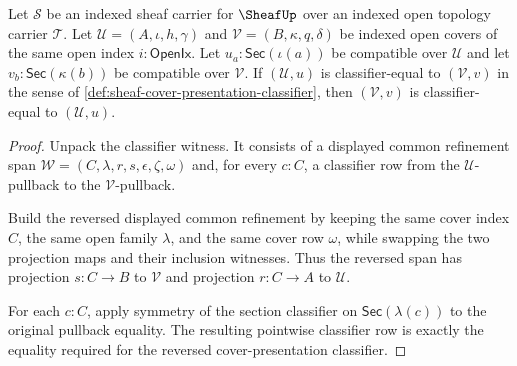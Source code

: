 \begin{theorem}
\label{thm:sheaf-cover-presentation-classifier-symmetric}
Let $\mathcal{S}$ be an indexed sheaf carrier for $\SheafUp$ over an indexed open topology carrier $\mathcal{T}$. Let $\mathcal{U}=(A,\iota,h,\gamma)$ and $\mathcal{V}=(B,\kappa,q,\delta)$ be indexed open covers of the same open index $i:\mathsf{OpenIx}$. Let $u_a:\mathsf{Sec}(\iota(a))$ be compatible over $\mathcal{U}$ and let $v_b:\mathsf{Sec}(\kappa(b))$ be compatible over $\mathcal{V}$. If $(\mathcal{U},u)$ is classifier-equal to $(\mathcal{V},v)$ in the sense of \autoref{def:sheaf-cover-presentation-classifier}, then $(\mathcal{V},v)$ is classifier-equal to $(\mathcal{U},u)$.
\end{theorem}
\begin{proof}
Unpack the classifier witness. It consists of a displayed common refinement span $\mathcal{W}=(C,\lambda,r,s,\epsilon,\zeta,\omega)$ and, for every $c:C$, a classifier row from the $\mathcal{U}$-pullback to the $\mathcal{V}$-pullback.

Build the reversed displayed common refinement by keeping the same cover index $C$, the same open family $\lambda$, and the same cover row $\omega$, while swapping the two projection maps and their inclusion witnesses. Thus the reversed span has projection $s:C\to B$ to $\mathcal{V}$ and projection $r:C\to A$ to $\mathcal{U}$.

For each $c:C$, apply symmetry of the section classifier on $\mathsf{Sec}(\lambda(c))$ to the original pullback equality. The resulting pointwise classifier row is exactly the equality required for the reversed cover-presentation classifier.
\end{proof}

